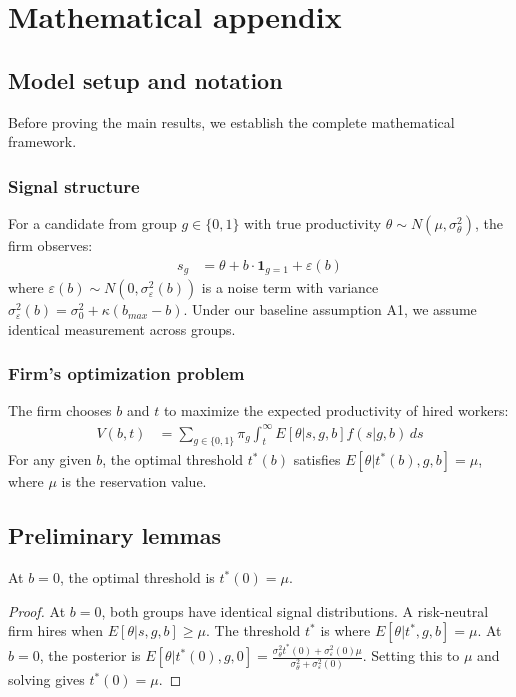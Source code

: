 \section{Mathematical appendix}

\subsection{Model setup and notation}

Before proving the main results, we establish the complete mathematical framework.

\subsubsection{Signal structure}
For a candidate from group $g \in \{0,1\}$ with true productivity $\theta \sim N(\mu, \sigma_\theta^2)$, the firm observes:
\begin{align}
s_g &= \theta + b \cdot \mathbf{1}_{g=1} + \varepsilon(b)
\end{align}
where $\varepsilon(b) \sim N(0, \sigma_\varepsilon^2(b))$ is a noise term with variance $\sigma_\varepsilon^2(b) = \sigma_0^2 + \kappa(b_{max} - b)$. Under our baseline assumption A1, we assume identical measurement across groups.

\subsubsection{Firm's optimization problem}
The firm chooses $b$ and $t$ to maximize the expected productivity of hired workers:
\begin{align}
V(b,t) &= \sum_{g \in \{0,1\}} \pi_g \int_t^\infty E[\theta | s, g, b] f(s|g,b) \, ds \label{eq:value_function_appendix}
\end{align}
For any given $b$, the optimal threshold $t^*(b)$ satisfies $E[\theta | t^*(b), g, b] = \mu$, where $\mu$ is the reservation value.

\subsection{Preliminary lemmas}

\begin{lemma}
At $b = 0$, the optimal threshold is $t^*(0) = \mu$.
\end{lemma}
\begin{proof}
At $b = 0$, both groups have identical signal distributions. A risk-neutral firm hires when $E[\theta|s,g,b] \geq \mu$. The threshold $t^*$ is where $E[\theta|t^*, g, b] = \mu$.
At $b=0$, the posterior is $E[\theta | t^*(0), g, 0] = \frac{\sigma_\theta^2 t^*(0) + \sigma_\varepsilon^2(0) \mu}{\sigma_\theta^2 + \sigma_\varepsilon^2(0)}$. Setting this to $\mu$ and solving gives $t^*(0)=\mu$.
\end{proof}

